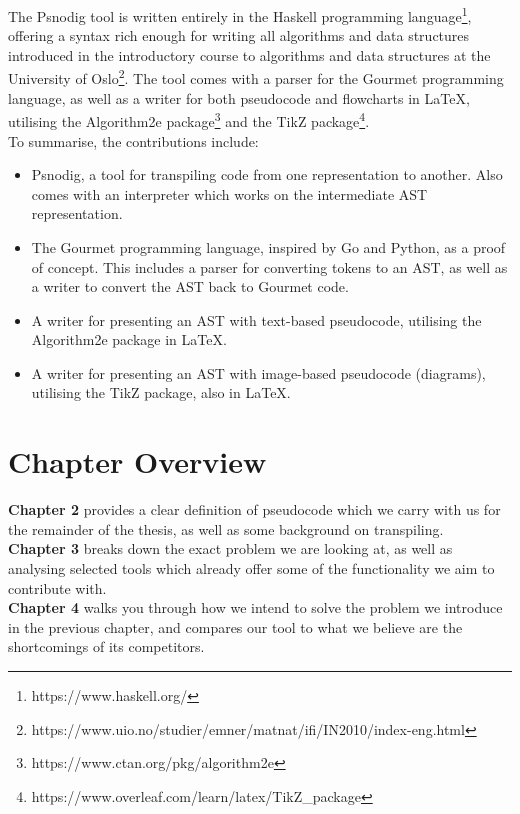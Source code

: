 The Psnodig tool is written entirely in the Haskell programming language\footnote{https://www.haskell.org/}, offering a syntax rich enough for writing all algorithms and data structures introduced in the introductory course to algorithms and data structures at the University of Oslo\footnote{https://www.uio.no/studier/emner/matnat/ifi/IN2010/index-eng.html}. The tool comes with a parser for the Gourmet programming language, as well as a writer for both pseudocode and flowcharts in \LaTeX, utilising the Algorithm2e package\footnote{https://www.ctan.org/pkg/algorithm2e} and the TikZ package\footnote{https://www.overleaf.com/learn/latex/TikZ\_package}. \hfill \\

To summarise, the contributions include:
\begin{itemize}
    \item Psnodig, a tool for transpiling code from one representation to another. Also comes with an interpreter which works on the intermediate AST representation.
    \item The Gourmet programming language, inspired by Go and Python, as a proof of concept. This includes a parser for converting tokens to an AST, as well as a writer to convert the AST back to Gourmet code.
    \item A writer for presenting an AST with text-based pseudocode, utilising the Algorithm2e package in \LaTeX.
    \item A writer for presenting an AST with image-based pseudocode (diagrams), utilising the TikZ package, also in \LaTeX.
\end{itemize}

\section{Chapter Overview}

\textbf{Chapter 2} provides a clear definition of pseudocode which we carry with us for the remainder of the thesis, as well as some background on transpiling. \hfill \\

\textbf{Chapter 3} breaks down the exact problem we are looking at, as well as analysing selected tools which already offer some of the functionality we aim to contribute with. \hfill \\

\textbf{Chapter 4} walks you through how we intend to solve the problem we introduce in the previous chapter, and compares our tool to what we believe are the shortcomings of its competitors. \hfill \\

